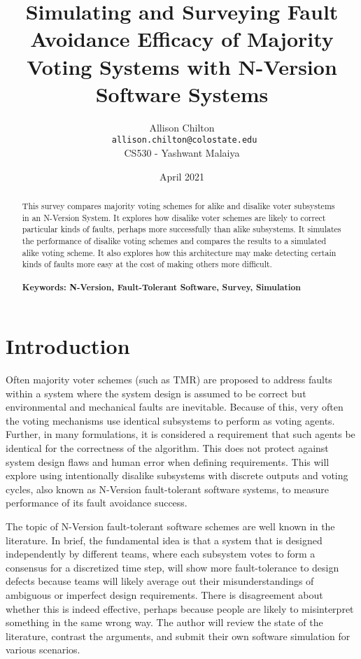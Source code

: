 \documentclass[article]{IEEEtran}
\begin{document}
\title{Simulating and Surveying Fault Avoidance Efficacy of Majority Voting Systems with N-Version Software Systems}
\author{Allison Chilton\\\texttt{ allison.chilton@colostate.edu}\\CS530 - Yashwant Malaiya}
\date{April 2021}

\maketitle


\begin{abstract}
This survey compares majority voting schemes for alike and disalike voter subsystems in an N-Version System. It explores how disalike voter schemes are likely to correct particular kinds of faults, perhaps more successfully than alike subsystems. It simulates the performance of disalike voting schemes and compares the results to a simulated alike voting scheme. It also explores how this architecture may make detecting certain kinds of faults more easy at the cost of making others more difficult.
\hfill\\\\
\textbf{Keywords: N-Version, Fault-Tolerant Software, Survey, Simulation}
\end{abstract}




\section{Introduction}
\par
Often majority voter schemes (such as TMR) are proposed to address faults within a system where the system design is assumed to be correct but environmental and mechanical faults are inevitable. Because of this, very often the voting mechanisms use identical subsystems to perform as voting agents. Further, in many formulations, it is considered a requirement that such agents be identical for the correctness of the algorithm. This does not protect against system design flaws and human error when defining requirements. This will explore using intentionally disalike subsystems with discrete outputs and voting cycles, also known as N-Version fault-tolerant software systems, to measure performance of its fault avoidance success. 
\par
The topic of N-Version fault-tolerant software schemes are well known in the literature. In brief, the fundamental idea is that a system that is designed independently by different teams, where each subsystem votes to form a consensus for a discretized time step, will show more fault-tolerance to design defects because teams will likely average out their misunderstandings of ambiguous or imperfect design requirements. There is disagreement about whether this is indeed effective, perhaps because people are likely to misinterpret something in the same wrong way. The author will review the state of the literature, contrast the arguments, and submit their own software simulation for various scenarios. 
\end{document}
